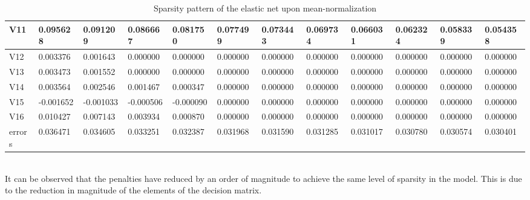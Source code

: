 \documentclass[a4paper,12pt]{article}
\begin{document}
\begin{table}[H]
{\begin{tabular}{|l|l|l|l|l|l|l|l|l|l|l|l|}
V11         & 0.095628  & 0.091209  & 0.086667  & 0.081750  & 0.077499  & 0.073443  & 0.069734  & 0.066031  & 0.062324  & 0.058339  & 0.054358  \\ \hline
V12         & 0.003376  & 0.001643  & 0.000000  & 0.000000  & 0.000000  & 0.000000  & 0.000000  & 0.000000  & 0.000000  & 0.000000  & 0.000000  \\ \hline
V13         & 0.003473  & 0.001552  & 0.000000  & 0.000000  & 0.000000  & 0.000000  & 0.000000  & 0.000000  & 0.000000  & 0.000000  & 0.000000  \\ \hline
V14         & 0.003564  & 0.002546  & 0.001467  & 0.000347  & 0.000000  & 0.000000  & 0.000000  & 0.000000  & 0.000000  & 0.000000  & 0.000000  \\ \hline
V15         & -0.001652 & -0.001033 & -0.000506 & -0.000090 & 0.000000  & 0.000000  & 0.000000  & 0.000000  & 0.000000  & 0.000000  & 0.000000  \\ \hline
V16         & 0.010427  & 0.007143  & 0.003934  & 0.000870  & 0.000000  & 0.000000  & 0.000000  & 0.000000  & 0.000000  & 0.000000  & 0.000000  \\ \hline
errors      & 0.036471  & 0.034605  & 0.033251  & 0.032387  & 0.031968  & 0.031590  & 0.031285  & 0.031017  & 0.030780  & 0.030574  & 0.030401  \\ \hline
\end{tabular}
}
\caption{Sparsity pattern of the elastic net upon mean-normalization}

\end{table} \\
It can be observed that the penalties have reduced by an order of magnitude to achieve the same level of sparsity in the model. This is due to the reduction in magnitude of the elements of the decision matrix.

\newpage

\newpage
\end{document}
